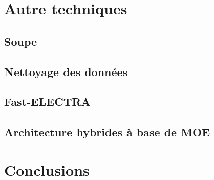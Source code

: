 \documentclass[12pt,twoside,maitrise]{dms}
\theoremstyle{definition}
\numberwithin{equation}{section}
\numberwithin{table}{chapter}
\numberwithin{figure}{chapter}
\begin{document}
\chapter{Autre techniques} \label{chapitre:autretechnique}
\section{Soupe}
\section{Nettoyage des données}
\section{Fast-ELECTRA}
\section{Architecture hybrides à base de MOE}
\chapter{Conclusions}




\def\bibname{R\'ef\'erences} %
\end{document}
